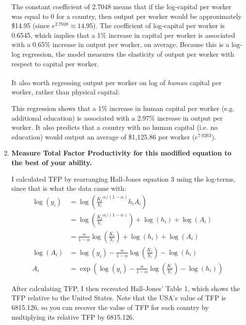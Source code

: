 \documentclass[12pt]{article}
\begin{document}
\begin{enumerate}
    The constant coefficient of 2.7048 means that if the log-capital per worker was equal to 0 for a country, then output per worker would be approximately \$14.95 (since $e^{2.7048} \approx 14.95$). The coefficient of log-capital per worker is 0.6545, which implies that a 1\% increase in capital per worker is associated with a 0.65\% increase in output per worker, on average. Because this is a log-log regression, the model measures the elasticity of output per worker with respect to capital per worker.
\\\\
    It also worth regressing output per worker on log of \textit{human} capital per worker, rather than physical capital:
    
    
    This regression shows that a 1\% increase in human capital per worker (e.g. additional education) is associated with a 2.97\% increase in output per worker. It also predicts that a country with no human capital (i.e. no education) would output an average of \$1,125.86 per worker ($e^{7.0263}$).

    \item \textbf{Measure Total Factor Productivity for this modified equation to the best of your ability.}
    
    I calculated TFP by rearranging Hall-Jones equation 3 using the log-terms, since that is what the data came with:
    \begin{align*}
    \log(y_i) &= \log\left(\frac{K_i}{Y_i}^{\alpha/(1-\alpha)}h_iA_i\right) \\
    &= \log\left(\frac{K_i}{Y_i}^{\alpha/(1-\alpha)}\right) + \log(h_i) + \log(A_i) \\
    &= \frac{\alpha}{1-\alpha}\log\left(\frac{K_i}{Y_i}\right) + \log(h_i) + \log(A_i) \\
    \log(A_i) &= \log(y_i) - \frac{\alpha}{1-\alpha}\log\left(\frac{K_i}{Y_i}\right) - \log(h_i) \\
    A_i &= \exp(\log(y_i) - \frac{\alpha}{1-\alpha}\log\left(\frac{K_i}{Y_i}\right) - \log(h_i))
    \end{align*}

    After calculating TFP, I then recreated Hall-Jones' Table 1, which shows the TFP relative to the United States. Note that the USA's value of TFP is 6815.126, so you can recover the value of TFP for each country by multiplying its relative TFP by 6815.126.

    
\end{enumerate}
\end{document}
